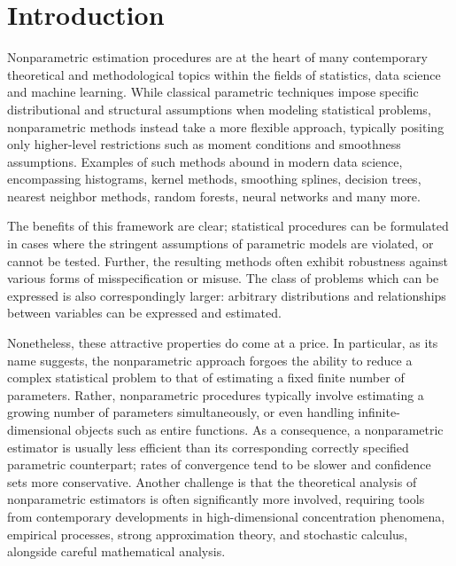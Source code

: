 
\chapter{Introduction}

Nonparametric estimation procedures are at the heart of many contemporary
theoretical and methodological topics within the fields of statistics, data
science and machine learning. While classical parametric techniques impose
specific distributional and structural assumptions when modeling statistical
problems, nonparametric methods instead take a more flexible approach,
typically positing only higher-level restrictions such as moment conditions and
smoothness assumptions. Examples of such methods abound in modern data science,
encompassing histograms, kernel methods, smoothing splines, decision trees,
nearest neighbor methods, random forests, neural networks and many more.

The benefits of this framework are clear; statistical procedures can be
formulated in cases where the stringent assumptions of parametric models are
violated, or cannot be tested. Further, the resulting methods often exhibit
robustness against various forms of misspecification or misuse. The class of
problems which can be expressed is also correspondingly larger: arbitrary
distributions and relationships between variables can be expressed and
estimated.

Nonetheless, these attractive properties do come at a price. In particular, as
its name suggests, the nonparametric approach forgoes the ability to reduce a
complex statistical problem to that of estimating a fixed finite number of
parameters. Rather, nonparametric procedures typically involve estimating a
growing number of parameters simultaneously, or even handling
infinite-dimensional objects such as entire functions. As a consequence, a
nonparametric estimator is usually less efficient than its corresponding
correctly specified parametric counterpart; rates of convergence tend to be
slower and confidence sets more conservative. Another challenge is that the
theoretical analysis of nonparametric estimators is often significantly more
involved, requiring tools from contemporary developments in high-dimensional
concentration phenomena, empirical processes, strong approximation theory, and
stochastic calculus, alongside careful mathematical analysis.

